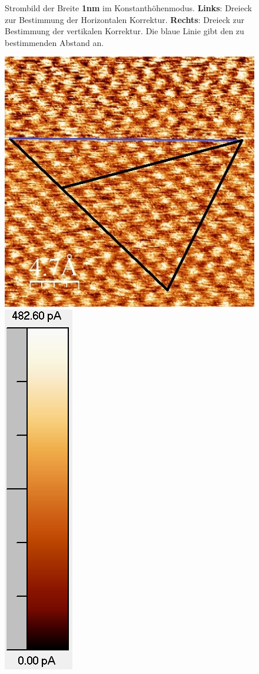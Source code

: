 \documentclass[12pt,a4paper]{article}
\begin{document}
\begin{figure}[H]
\caption{Strombild der Breite \textbf{1nm} im Konstanthöhenmodus. \textbf{Links}: Dreieck zur Bestimmung der Horizontalen Korrektur. \textbf{Rechts}: Dreieck zur Bestimmung der vertikalen Korrektur. Die blaue Linie gibt den zu bestimmenden Abstand an.}
\end{figure}

\begin{figure}[H]
\centering
\includegraphics[scale=0.6]{Bilder/Atome/hoch2_h.jpg}
\includegraphics[scale=0.59]{Bilder/Atome/hoch2_scale.png}

\end{figure}
\end{document}
